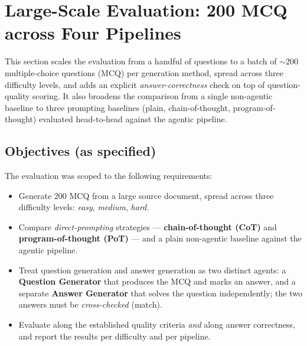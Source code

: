 
\section{Large-Scale Evaluation: 200 MCQ across Four Pipelines}
\label{sec:bulk-eval}

This section scales the evaluation from a handful of questions to a batch of
$\sim\!200$ multiple-choice questions (MCQ) per generation method, spread across
three difficulty levels, and adds an explicit \emph{answer-correctness} check on
top of question-quality scoring. It also broadens the comparison from a single
non-agentic baseline to three prompting baselines (plain, chain-of-thought,
program-of-thought) evaluated head-to-head against the agentic pipeline.

\subsection{Objectives (as specified)}
\label{sec:bulk-objectives}

The evaluation was scoped to the following requirements:
\begin{itemize}
  \item Generate $200$ MCQ from a large source document, spread across three
        difficulty levels: \emph{easy}, \emph{medium}, \emph{hard}.
  \item Compare \emph{direct-prompting} strategies --- \textbf{chain-of-thought
        (CoT)} and \textbf{program-of-thought (PoT)} --- and a plain non-agentic
        baseline against the agentic pipeline.
  \item Treat question generation and answer generation as two distinct agents:
        a \textbf{Question Generator} that produces the MCQ and marks an answer,
        and a separate \textbf{Answer Generator} that solves the question
        independently; the two answers must be \emph{cross-checked} (match).
  \item Evaluate along the established quality criteria \emph{and} along answer
        correctness, and report the results per difficulty and per pipeline.
\end{itemize}

